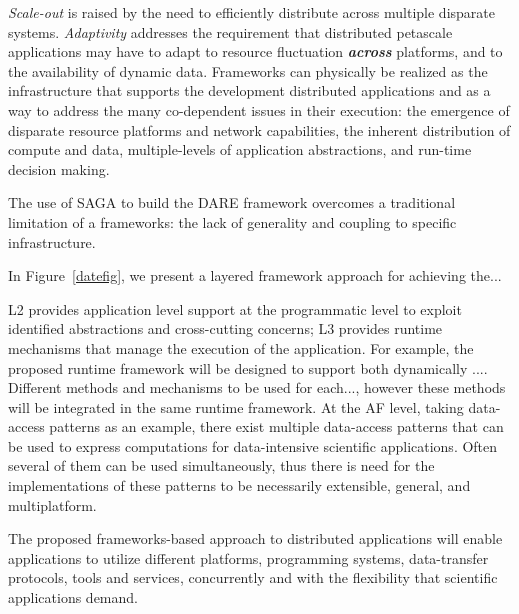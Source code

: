 \documentclass[]{svjour3}
\begin{document}
{\it Scale-out} is raised by the need to efficiently distribute across
multiple disparate systems. {\it Adaptivity} addresses the requirement
that distributed petascale applications may have to adapt to resource
fluctuation {\bf \em across} platforms, and to the availability of
dynamic data.  Frameworks can physically be realized as the
infrastructure that supports the development distributed applications
and as a way to address the many co-dependent issues in their
execution: the emergence of disparate resource platforms and network
capabilities, the inherent distribution of compute and data,
multiple-levels of application abstractions, and run-time decision
making.

The use of SAGA to build the DARE framework overcomes a traditional
limitation of a frameworks: the lack of generality and coupling
to specific infrastructure.


In Figure~\ref{datefig}, we present a layered framework approach for
achieving the... 

L2 provides application level support at the programmatic level to
exploit identified abstractions and cross-cutting concerns; L3
provides runtime mechanisms that manage the execution of the
application.  For example, the proposed runtime framework will be
designed to support both dynamically .... Different methods and
mechanisms to be used for each..., however these methods will be
integrated in the same runtime framework.  At the AF level, taking
data-access patterns as an example, there exist multiple data-access
patterns that can be used to express computations for data-intensive
scientific applications. Often several of them can be used
simultaneously, thus there is need for the implementations of these
patterns to be necessarily extensible, general, and multiplatform.

The proposed frameworks-based approach to distributed applications
will enable applications to utilize different platforms, programming
systems, data-transfer protocols, tools and services, concurrently and
with the flexibility that scientific applications demand.  
\end{document}
